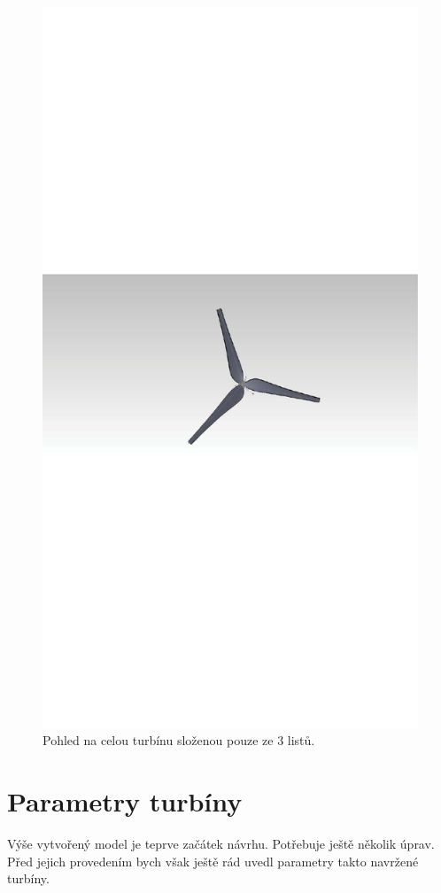 	\begin{figure}[H]
					\centering
					\includegraphics[]{obrazky/rotor/celekp}
					\caption{Pohled na celou turbínu složenou pouze ze 3 listů.}
					\label{obr.model3}
		\end{figure}
		
	\section{Parametry turbíny}
	Výše vytvořený model je teprve začátek návrhu. Potřebuje ještě několik úprav. Před jejich provedením bych však ještě rád uvedl parametry takto navržené turbíny.
	

